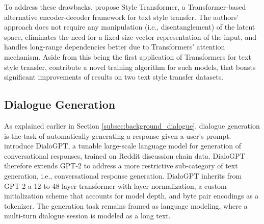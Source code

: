 
To address these drawbacks, \cite{dai2019style} propose Style Transformer, a Transformer-based alternative encoder-decoder framework for text style transfer. The authors' approach does not require any manipulation (i.e., disentanglement) of the latent space, eliminates the need for a fixed-size vector representation of the input, and handles long-range dependencies better due to Transformers' attention mechanism. Aside from this being the first application of Transformers for text style transfer, \cite{dai2019style} contribute a novel training algorithm for such models, that boasts significant improvements of results on two text style transfer datasets.

\subsection{Dialogue Generation}
As explained earlier in Section \ref{subsec:background_dialogue}, dialogue generation is the task of automatically generating a response given a user's prompt. \cite{zhang2019dialogpt} introduce DialoGPT, a tunable large-scale language model for generation of conversational responses, trained on Reddit discussion chain data. DialoGPT therefore extends GPT-2 \citep{radford2019language} to address a more restrictive sub-category of text generation, i.e., conversational response generation. DialoGPT inherits from GPT-2 a 12-to-48 layer transformer with layer normalization, a custom initialization scheme that accounts for model depth, and byte pair encodings \citep{sennrich-etal-2016-neural} as a tokenizer. The generation task remains framed as language modeling, where a multi-turn dialogue session is modeled as a long text. 

